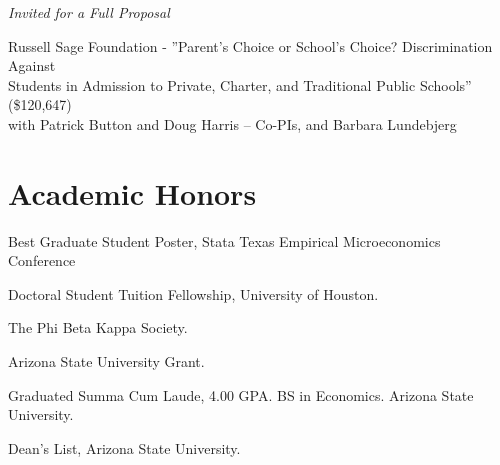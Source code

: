 \documentclass[letterpaper]{article}
\renewenvironment{itemize}{
  \begin{list}{}{
    \setlength{\leftmargin}{1.5em}
  }
}{
  \end{list}
}
\begin{document}
\vspace{2 mm}
\textit{Invited for a Full Proposal
}\begin{itemize}
  \item {}Russell Sage Foundation - ”Parent’s Choice or School’s Choice? Discrimination Against \\{\makebox[17mm]{\hfill}} Students in Admission to Private, Charter, and Traditional Public Schools” (\$120,647) \\{\makebox[17mm]{\hfill}}  with Patrick Button and Doug Harris – Co-PIs, and Barbara Lundebjerg
\end{itemize}

\section*{Academic Honors}
\vspace{2 mm}
\begin{itemize}
\item {} Best Graduate Student Poster, Stata Texas Empirical Microeconomics Conference
\item {} Doctoral Student Tuition Fellowship, University of Houston. 
\item {} The Phi Beta Kappa Society. 
\item {} Arizona State University Grant. 
\item {} Graduated Summa Cum Laude, 4.00 GPA. BS in Economics. Arizona State University. 
\item {} Dean's List, Arizona State University. 
\end{itemize}
\vspace{2 mm}
\end{document}
